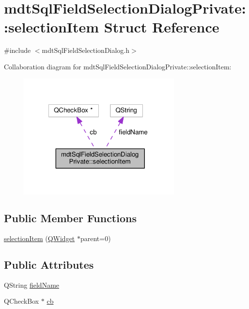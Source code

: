 \hypertarget{structmdt_sql_field_selection_dialog_private_1_1selection_item}{\section{mdt\-Sql\-Field\-Selection\-Dialog\-Private\-:\-:selection\-Item Struct Reference}
\label{structmdt_sql_field_selection_dialog_private_1_1selection_item}
}


{\ttfamily \#include $<$mdt\-Sql\-Field\-Selection\-Dialog.\-h$>$}



Collaboration diagram for mdt\-Sql\-Field\-Selection\-Dialog\-Private\-:\-:selection\-Item\-:
\nopagebreak
\begin{figure}[H]
\begin{center}
\leavevmode
\includegraphics[width=233pt]{structmdt_sql_field_selection_dialog_private_1_1selection_item__coll__graph}
\end{center}
\end{figure}
\subsection*{Public Member Functions}
\begin{DoxyCompactItemize}
\item 
\hyperlink{structmdt_sql_field_selection_dialog_private_1_1selection_item_af63aae7a8d7c4e00d59a174174927976}{selection\-Item} (\hyperlink{class_q_widget}{Q\-Widget} $\ast$parent=0)
\end{DoxyCompactItemize}
\subsection*{Public Attributes}
\begin{DoxyCompactItemize}
\item 
Q\-String \hyperlink{structmdt_sql_field_selection_dialog_private_1_1selection_item_a77cd7117a117e9eb7124fbd57267ba56}{field\-Name}
\item 
Q\-Check\-Box $\ast$ \hyperlink{structmdt_sql_field_selection_dialog_private_1_1selection_item_ac9a676bd8100fdec77985c1bbfa1dfc0}{cb}
\end{DoxyCompactItemize}


